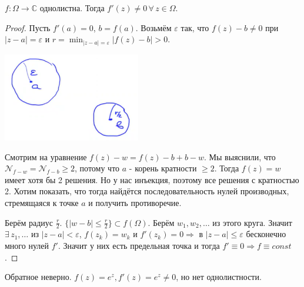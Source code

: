 \begin{theorem}
    $f : \Omega \to \mathbb{C}$ однолистна. Тогда $f'(z) \neq 0 \, \forall \, z \in \Omega$.
\end{theorem}

\begin{proof}
    Пусть $f'(a) = 0$, $b = f(a)$. Возьмём $\varepsilon$ так, что
    $f(z) - b \neq 0$ при $|z - a| = \varepsilon$ и $r = \min_{|z - a| = \varepsilon} |f(z) - b| > 0$.

    \begin{center}
        \includegraphics[width=6cm]{assets/04-functions-of-complex-variables/single-leaf-theorem-derivative-none-zero.png}
    \end{center}

    Смотрим на уравнение $f(z) - w = f(z) - b + b - w$. Мы выяснили, что
    $\mathcal{N}_{f - w} = \mathcal{N}_{f - b} \geqslant 2$, потому что
    $a$ - корень кратности $\geqslant 2$. Тогда $f(z) = w$ имеет хотя бы 2 решения. Но у нас инъекция, поэтому
    все решения с кратностью 2. Хотим показать, что тогда найдётся последовательность нулей производных,
    стремящаяся к точке $a$ и получить противоречие.

    Берём радиус $\frac{r}{2}$. $\{ |w - b| \leqslant \frac{r}{2} \} \subset f(\Omega)$.
    Берём $w_1, w_2, \ldots$ из этого круга. Значит $\exists \, z_1, \ldots$ из $|z - a| < \varepsilon$,
    $f(z_k) = w_k$ и $f'(z_k) = 0 \Rightarrow$ в $|z - a| \leqslant \varepsilon$ бесконечно много нулей
    $f'$. Значит у них есть предельная точка и тогда $f' \equiv 0 \Rightarrow f \equiv const$.
\end{proof}

\begin{remark}
    Обратное неверно. $f(z) = e^z, f'(z) = e^z \neq 0$, но нет однолистности.
\end{remark}

